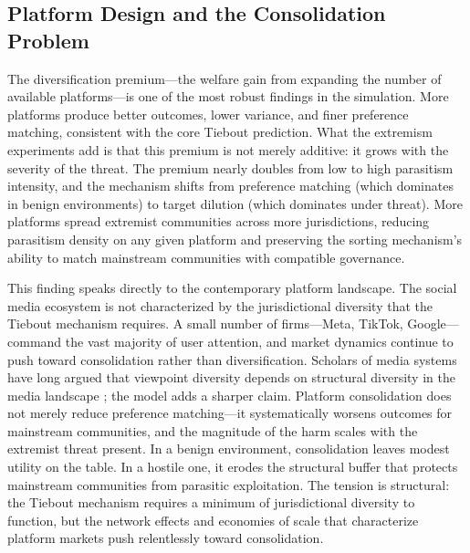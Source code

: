 \documentclass{article}
\begin{document}
\subsection{Platform Design and the Consolidation Problem}

The diversification premium---the welfare gain from expanding the number of available platforms---is one of the most robust findings in the simulation. More platforms produce better outcomes, lower variance, and finer preference matching, consistent with the core Tiebout prediction. What the extremism experiments add is that this premium is not merely additive: it grows with the severity of the threat. The premium nearly doubles from low to high parasitism intensity, and the mechanism shifts from preference matching (which dominates in benign environments) to target dilution (which dominates under threat). More platforms spread extremist communities across more jurisdictions, reducing parasitism density on any given platform and preserving the sorting mechanism's ability to match mainstream communities with compatible governance.

This finding speaks directly to the contemporary platform landscape. The social media ecosystem is not characterized by the jurisdictional diversity that the Tiebout mechanism requires. A small number of firms---Meta, TikTok, Google---command the vast majority of user attention, and market dynamics continue to push toward consolidation rather than diversification. Scholars of media systems have long argued that viewpoint diversity depends on structural diversity in the media landscape \citep{tufekci2017twitter}; the model adds a sharper claim. Platform consolidation does not merely reduce preference matching---it systematically worsens outcomes for mainstream communities, and the magnitude of the harm scales with the extremist threat present. In a benign environment, consolidation leaves modest utility on the table. In a hostile one, it erodes the structural buffer that protects mainstream communities from parasitic exploitation. The tension is structural: the Tiebout mechanism requires a minimum of jurisdictional diversity to function, but the network effects and economies of scale that characterize platform markets push relentlessly toward consolidation.
\end{document}
